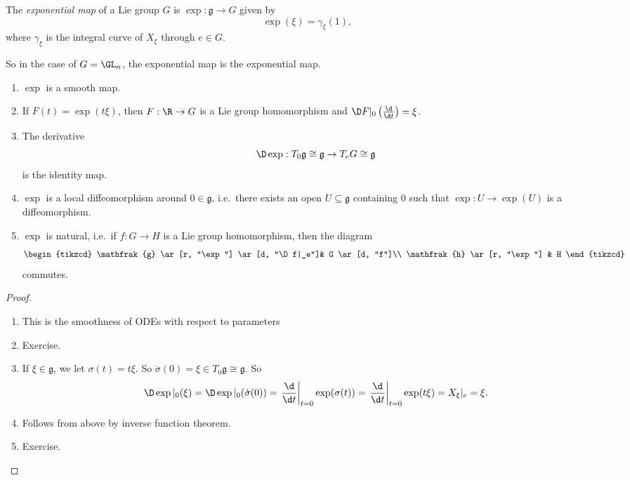 \documentclass[a4paper]{article}
\begin{document}
\begin{defi}
  The \emph{exponential map} of a Lie group $G$ is $\exp: \mathfrak{g} \to G$ given by
  \[
    \exp(\xi) = \gamma_\xi(1),
  \]
  where $\gamma_\xi$ is the integral curve of $X_\xi$ through $e \in G$.
\end{defi}
So in the case of $G = \GL_n$, the exponential map is the exponential map.

\begin{prop}\leavevmode
  \begin{enumerate}
    \item $\exp$ is a smooth map.
    \item If $F(t) = \exp(t\xi)$, then $F: \R \to G$ is a Lie group homomorphism and $\D F|_0 \left(\frac{\d}{\d t}\right) = \xi$.
    \item The derivative
      \[
        \D \exp: T_0 \mathfrak{g} \cong \mathfrak{g} \to T_e G \cong \mathfrak{g}
      \]
      is the identity map.
    \item $\exp$ is a local diffeomorphism around $0 \in \mathfrak{g}$, i.e.\ there exists an open $U \subseteq \mathfrak{g}$ containing $0$ such that $\exp: U \to \exp(U)$ is a diffeomorphism.
    \item $\exp$ is natural, i.e.\ if $f: G \to H$ is a Lie group homomorphism, then the diagram
      \[
        \begin{tikzcd}
          \mathfrak{g} \ar[r, "\exp"] \ar[d, "\D f|_e"]& G \ar[d, "f"]\\
          \mathfrak{h} \ar[r, "\exp"] & H
        \end{tikzcd}
      \]
      commutes.
  \end{enumerate}
\end{prop}

\begin{proof}\leavevmode
  \begin{enumerate}
    \item This is the smoothness of ODEs with respect to parameters
    \item Exercise.
    \item If $\xi \in \mathfrak{g}$, we let $\sigma(t) = t \xi$. So $\dot{\sigma}(0) = \xi \in T_0 \mathfrak{g} \cong \mathfrak{g}$. So
      \[
        \D \exp|_0 (\xi) = \D \exp|_0(\dot{\sigma}(0)) = \left.\frac{\d}{\d t}\right|_{t = 0} \exp(\sigma(t)) = \left.\frac{\d}{\d t}\right|_{t = 0} \exp(t \xi) = X_\xi|_e = \xi.
      \]
    \item Follows from above by inverse function theorem.
    \item Exercise. \qedhere
  \end{enumerate}
\end{proof}
\end{document}
